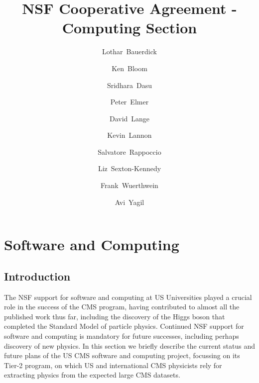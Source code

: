 \documentclass[11pt,a4paper]{article}
\begin{document}
\title{NSF Cooperative Agreement - Computing Section}

\author[1]{Lothar~Bauerdick}

\author[2]{Ken~Bloom}

\author[3]{Sridhara~Dasu}

\author[4]{Peter~Elmer}

\author[5]{David~Lange}

\author[6]{Kevin~Lannon}

\author[7]{Salvatore~Rappoccio}

\author[1]{Liz~Sexton-Kennedy}

\author[8]{Frank~Wuerthwein}

\author[8]{Avi~Yagil}


\renewcommand\Authands{ and }

\maketitle

\newpage

\section{Software and Computing}

\subsection{Introduction}

The NSF support for software and computing at US Universities
played a crucial role in the success of the CMS program, having
contributed to almost all the published work thus far, including the
discovery of the Higgs boson that completed the Standard Model of
particle physics.  Continued NSF support for software and computing is
mandatory for future successes, including perhaps discovery of new
physics.  In this section we briefly describe the current status and
future plans of the US CMS software and computing project, focussing on
its Tier-2 program, on which US and international CMS physicists rely
for extracting physics from the expected large CMS datasets.
\end{document}
